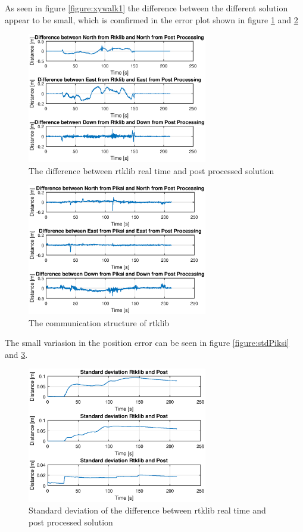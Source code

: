 As seen in figure \ref{figure:xywalk1} the difference between the different solution appear to be small, which is comfirmed in the error plot shown in figure \ref{figure:errorRTKwalk1} and \ref{figure:errorPiksiwalk1}
\begin{figure}[H]
	\centering
		\includegraphics[width=0.7\textwidth]{figs/plots/ertkpost.eps}
		\caption{The difference between rtklib real time and post processed solution}
		\label{figure:errorRTKwalk1}
\end{figure}
\begin{figure}[H]
	\centering
		\includegraphics[width=0.7\textwidth]{figs/plots/epiksiport.eps}
		\caption{The communication structure of rtklib}
		\label{figure:errorPiksiwalk1}
\end{figure}
The small variasion in the position error can be seen in figure \ref{figure:stdPiksi} and \ref{figure:stdRTK}. 
\begin{figure}[H]
	\centering
		\includegraphics[width=0.7\textwidth]{figs/plots/stdrtkpost.eps}
		\caption{Standard deviation of the difference between rtklib real time and post processed solution}
		\label{figure:stdRTK}
\end{figure}
